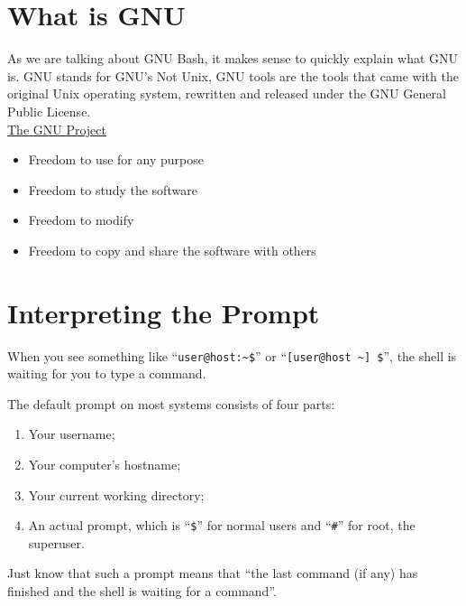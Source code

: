 \documentclass{book}
\begin{document}
\section{What is GNU}

As we are talking about GNU Bash, it makes sense to quickly explain what GNU is. GNU stands for GNU's Not Unix, GNU tools are the tools that came with the original Unix operating system, rewritten and released under the GNU General Public License.\\

\href{https://www.gnu.org/}{The GNU Project}

\begin{itemize}
\item Freedom to use for any purpose
\item Freedom to study the software
\item Freedom to modify
\item Freedom to copy and share the software with others
\end{itemize}

\section{Interpreting the Prompt}

When you see something like ``\verb|user@host:~$|'' or ``\verb|[user@host ~] $|'', the shell is waiting for you to type a command.

The default prompt on most systems consists of four parts:
\begin{enumerate}
\item Your username;
\item Your computer's hostname;
\item Your current working directory;
\item An actual prompt, which is ``\verb|$|'' for normal users and ``\verb|#|'' for root, the superuser.
\end{enumerate}


Just know that such a prompt means that ``the last command (if any) has finished and the shell is waiting for a command''.
\end{document}

